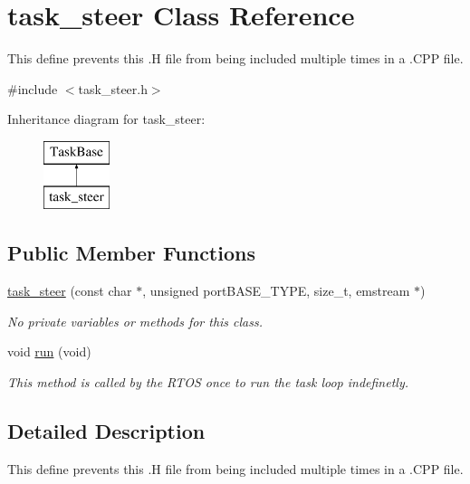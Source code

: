 \hypertarget{classtask__steer}{\section{task\-\_\-steer Class Reference}
\label{classtask__steer}
}


This define prevents this .H file from being included multiple times in a .C\-P\-P file.  




{\ttfamily \#include $<$task\-\_\-steer.\-h$>$}

Inheritance diagram for task\-\_\-steer\-:\begin{figure}[H]
\begin{center}
\leavevmode
\includegraphics[height=2.000000cm]{classtask__steer}
\end{center}
\end{figure}
\subsection*{Public Member Functions}
\begin{DoxyCompactItemize}
\item 
\hyperlink{classtask__steer_a546f7ccabbb99ecce4e09bcf94c8d76d}{task\-\_\-steer} (const char $\ast$, unsigned port\-B\-A\-S\-E\-\_\-\-T\-Y\-P\-E, size\-\_\-t, emstream $\ast$)
\begin{DoxyCompactList}\small\item\em No private variables or methods for this class. \end{DoxyCompactList}\item 
void \hyperlink{classtask__steer_a83885f35338df1ea7c221f46480fead8}{run} (void)
\begin{DoxyCompactList}\small\item\em This method is called by the R\-T\-O\-S once to run the task loop indefinetly. \end{DoxyCompactList}\end{DoxyCompactItemize}


\subsection{Detailed Description}
This define prevents this .H file from being included multiple times in a .C\-P\-P file. 


